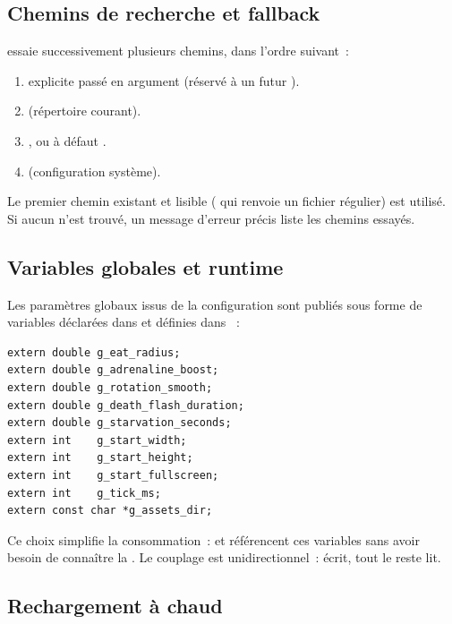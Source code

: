 \subsection{Chemins de recherche et fallback}

 essaie successivement plusieurs chemins, dans
l'ordre suivant~:

\begin{enumerate}
  \item {} explicite passé en argument
    (réservé à un futur ).
  \item {} (répertoire courant).
  \item {}, ou à
    défaut .
  \item {} (configuration système).
\end{enumerate}

Le premier chemin existant et lisible ( qui renvoie
un fichier régulier) est utilisé. Si aucun n'est trouvé, un
message d'erreur précis liste les chemins essayés.

\subsection{Variables globales et runtime}

Les paramètres globaux issus de la configuration sont publiés
sous forme de variables  déclarées dans
 et définies dans ~:

\begin{verbatim}
extern double g_eat_radius;
extern double g_adrenaline_boost;
extern double g_rotation_smooth;
extern double g_death_flash_duration;
extern double g_starvation_seconds;
extern int    g_start_width;
extern int    g_start_height;
extern int    g_start_fullscreen;
extern int    g_tick_ms;
extern const char *g_assets_dir;
\end{verbatim}

Ce choix simplifie la consommation~:  et
 référencent ces variables sans avoir besoin
de connaître la . Le couplage est
unidirectionnel~:  écrit, tout le reste lit.

\subsection{Rechargement à chaud}

